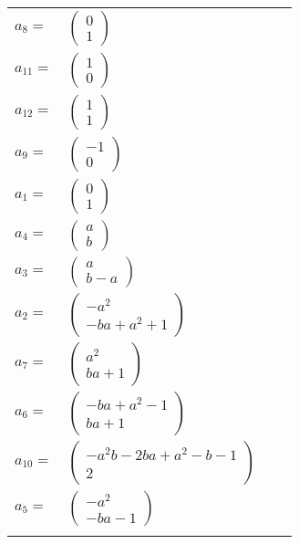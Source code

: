 \documentclass[1p]{elsarticle_modified}
\theoremstyle{definition}
\begin{document}
\begin{tabular}{m{7pt} m{180pt} m{7pt} m{180pt} }
\flushright $a_{8}=$&$\begin{pmatrix}0\\1\end{pmatrix}$ \\
\flushright $a_{11}=$&$\begin{pmatrix}1\\0\end{pmatrix}$ \\
\flushright $a_{12}=$&$\begin{pmatrix}1\\1\end{pmatrix}$ \\
\flushright $a_{9}=$&$\begin{pmatrix}-1\\0\end{pmatrix}$ \\
\flushright $a_{1}=$&$\begin{pmatrix}0\\1\end{pmatrix}$ \\
\flushright $a_{4}=$&$\begin{pmatrix}a\\b\end{pmatrix}$ \\
\flushright $a_{3}=$&$\begin{pmatrix}a\\b- a\end{pmatrix}$ \\
\flushright $a_{2}=$&$\begin{pmatrix}- a^2\\- b a+a^2+1\end{pmatrix}$ \\
\flushright $a_{7}=$&$\begin{pmatrix}a^2\\b a+1\end{pmatrix}$ \\
\flushright $a_{6}=$&$\begin{pmatrix}- b a+a^2-1\\b a+1\end{pmatrix}$ \\
\flushright $a_{10}=$&$\begin{pmatrix}- a^2 b-2 b a+a^2- b-1\\2\end{pmatrix}$ \\
\flushright $a_{5}=$&$\begin{pmatrix}- a^2\\- b a-1\end{pmatrix}$\\&\end{tabular}
\end{document}
